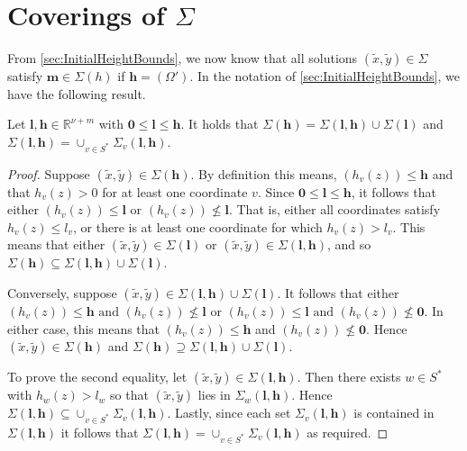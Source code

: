 \section{Coverings of $\Sigma$}
\label{sec:CoveringsofSigma}

From \autoref{sec:InitialHeightBounds}, we now know that all solutions $(\tilde{x},\tilde{y}) \in \Sigma$ satisfy $\mathbf{m}\in \Sigma(h)$ if ${\mathbf{h} = (\Omega')}$. In the notation of \autoref{sec:InitialHeightBounds}, we have the following result. 

\begin{lemma}\label{lem:covering}
Let $\mathbf{l},\mathbf{h}\in\mathbb{R}^{\nu+m}$ with $\mathbf{0}\leq \mathbf{l}\leq \mathbf{h}$. It holds that $\Sigma(\mathbf{h})=\Sigma(\mathbf{l},\mathbf{h})\cup \Sigma(\mathbf{l})$ and $\Sigma(\mathbf{l},\mathbf{h})=\cup_{v \in S^*}\Sigma_v(\mathbf{l},\mathbf{h})$.
\end{lemma}

\begin{proof}
Suppose $(\tilde{x},\tilde{y}) \in \Sigma(\mathbf{h})$. By definition this means, $(h_v(z))\leq \mathbf{h}$ and that $h_v(z) > 0$ for at least one coordinate $v$. Since $\mathbf{0} \leq \mathbf{l} \leq \mathbf{h}$, it follows that either $(h_v(z))\leq \mathbf{l}$ or $(h_v(z))\nleq \mathbf{l}$. That is, either all coordinates satisfy $h_v(z) \leq l_v$, or there is at least one coordinate for which $h_v(z) > l_v$. This means that either $(\tilde{x},\tilde{y}) \in \Sigma(\mathbf{l})$ or $(\tilde{x},\tilde{y}) \in \Sigma(\mathbf{l},\mathbf{h})$, and so $\Sigma(\mathbf{h}) \subseteq \Sigma(\mathbf{l},\mathbf{h}) \cup \Sigma(\mathbf{l})$.

Conversely, suppose  $(\tilde{x},\tilde{y}) \in \Sigma(\mathbf{l},\mathbf{h}) \cup \Sigma(\mathbf{l})$. It follows that either $(h_v(z))\leq \mathbf{h} \text{ and } (h_v(z))\nleq \mathbf{l}$ or $(h_v(z))\leq \mathbf{l} \text{ and } (h_v(z))\nleq \mathbf{0}$. In either case, this means that $(h_v(z)) \leq \mathbf{h}$ and $(h_v(z)) \nleq \mathbf{0}$. Hence $(\tilde{x},\tilde{y}) \in \Sigma(\mathbf{h})$ and $\Sigma(\mathbf{h}) \supseteq \Sigma(\mathbf{l},\mathbf{h}) \cup \Sigma(\mathbf{l})$.

To prove the second equality, let $(\tilde{x},\tilde{y}) \in \Sigma(\mathbf{l},\mathbf{h})$. Then there exists $w\in S^*$ with $h_w(z)>l_w$ so that $(\tilde{x},\tilde{y})$ lies in $\Sigma_w(\mathbf{l},\mathbf{h})$. Hence $\Sigma(\mathbf{l},\mathbf{h}) \subseteq \cup_{v\in S^*}\Sigma_v(\mathbf{l},\mathbf{h})$. Lastly, since each set $\Sigma_v(\mathbf{l},\mathbf{h})$ is contained in $\Sigma(\mathbf{l},\mathbf{h})$ it follows that $\Sigma(\mathbf{l},\mathbf{h})=\cup_{v\in S^*}\Sigma_v(\mathbf{l},\mathbf{h})$ as required. 
\end{proof}

